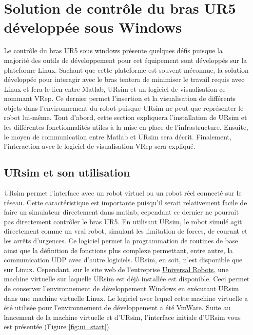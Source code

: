 \documentclass[root.tex]{subfiles}
\begin{document}
\section{Solution de contrôle du bras UR5 développée sous Windows}

Le contrôle du bras UR5 sous windows présente quelques défis puisque la majorité des outils de développement pour cet équipement sont développés sur la plateforme Linux.
Sachant que cette plateforme est souvent méconnue, la solution développée pour interagir avec le bras tentera de minimiser le travail requis avec Linux et fera le lien entre Matlab, URsim et un logiciel de visualisation ce nommant VRep. 
Ce dernier permet l'insertion et la visualisation de différents objets dans l'environnement du robot puisque URsim ne peut que représenter le robot lui-même.
Tout d'abord, cette section expliquera l'installation de URsim et les différentes fonctionnalités utiles à la mise en place de l'infrastructure.
Ensuite, le moyen de communication entre Matlab et URsim sera décrit.
Finalement, l'interaction avec le logiciel de visualisation VRep sera expliqué.

\subsection{URsim et son utilisation}

URsim permet l'interface avec un robot virtuel ou un robot réel connecté sur le réseau.
Cette caractéristique est importante puisqu'il serait relativement facile de faire un simulateur directement dans matlab, cependant ce dernier ne pourrait pas directement contrôler le bras UR5.
En utilisant URsim, le robot simulé agit directement comme un vrai robot, simulant les limitation de forces, de courant et les arrêts d'urgences.
Ce logiciel permet la programmation de routines de base ainsi que la définition de fonctions plus complexe permettant, entre autre, la communication UDP avec d'autre logiciels.
URsim, en soit, n'est disponible que sur Linux.
Cependant, sur le site web de l'entreprise \href{https://www.universal-robots.com/download/}{Universal Robots}, une machine virtuelle sur laquelle URsim est déjà installée est disponible.
Ceci permet de conserver l'environnement de développement Windows en exécutant URsim dans une machine virtuelle Linux.
Le logiciel avec lequel cette machine virtuelle a été utilisée pour l'environnement de développement a été VmWare.
Suite au lancement de la machine virtuelle et d'URsim, l'interface initiale d'URsim vous est présentée (Figure \ref{fig:ui_start}).
\end{document}
